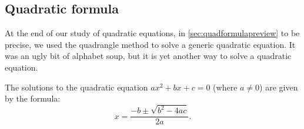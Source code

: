 \subsection{Quadratic formula}

At the end of our study of quadratic equations, in \cref{sec:quadformulapreview} to be precise, we used the quadrangle method to solve a generic quadratic equation. It was an ugly bit of alphabet soup, but it is yet another way to solve a quadratic equation.

\begin{boxeddef}
The solutions to the quadratic equation $ax^2 + bx + c=0$ (where $a\neq0$) are given by the formula:
\[x=\frac{-b\pm\sqrt{b^2-4ac}}{2a}.\]
\end{boxeddef}


%
%
%
%
%
%
%
%
%
%
%
%
%
%
%
%
%
%
%

